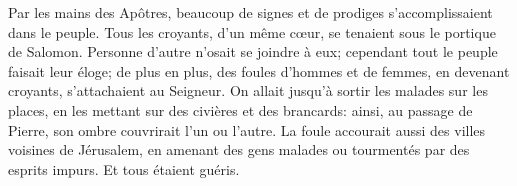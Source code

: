 Par les mains des Apôtres,
	beaucoup de signes et de prodiges s’accomplissaient dans le peuple.
Tous les croyants, d’un même cœur, se tenaient sous le portique de Salomon.
Personne d’autre n’osait se joindre à eux;
	cependant tout le peuple faisait leur éloge;
	de plus en plus, des foules d’hommes et de femmes,
	en devenant croyants, s’attachaient au Seigneur.
On allait jusqu’à sortir les malades sur les places,
	en les mettant sur des civières et des brancards:
	ainsi, au passage de Pierre, son ombre couvrirait l’un ou l’autre.
La foule accourait aussi des villes voisines de Jérusalem,
	en amenant des gens malades ou tourmentés par des esprits impurs.
	Et tous étaient guéris.
